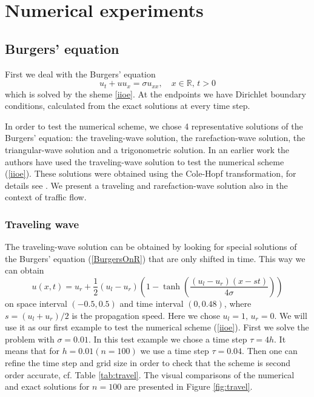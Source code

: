 \documentclass[a4paper,12pt,twoside]{report}%
\begin{document}

\chapter{Numerical experiments}
\section{Burgers' equation}
First we deal with the Burgers' equation
\begin{equation}
		u_t + uu_x =\sigma u_{xx},\quad x\in \mathbb{R},\, t > 0
		\label{BurgersOnR}
\end{equation}
which is solved by the sheme \eqref{iioe}. At the endpoints we have Dirichlet boundary conditions, calculated from the exact solutions at every time step.

In order to test the numerical scheme, we chose 4 representative solutions of the Burgers' equation:
the traveling-wave solution, the rarefaction-wave solution, the triangular-wave solution and a trigonometric solution. In an earlier work \cite{iioe0} the authors have used the traveling-wave solution to test the numerical scheme (\ref{iioe}). These solutions were obtained using the Cole-Hopf transformation, for details see \cite{olv}. We present a traveling and rarefaction-wave solution also in the context of traffic flow.
\subsection{Traveling wave}
The traveling-wave solution can be obtained by looking for special solutions of the Burgers' equation (\ref{BurgersOnR}) that are only shifted in time. This way we can obtain
\begin{equation}
	u(x,t) = u_r + \frac{1}{2}(u_l-u_r)\left(1-\tanh \left(\frac{(u_l-u_r)(x-st)}{4 \sigma}\right) \right)
	\label{travel}
\end{equation}
on space interval $ (-0.5, 0.5) $ and time interval $ (0, 0.48) $, where $ s = (u_l + u_r)/2 $ is the propagation speed. Here we chose $ u_l = 1,\,u_r = 0 $. We will use it as our first example to test the numerical scheme (\ref{iioe}).
First we solve the problem with $ \sigma = 0.01 $.
In this test example we chose a time step $ \tau = 4h $. It means that for $ h = 0.01 (n = 100) $ we use a time step $ \tau = 0.04 $. Then one can refine the time step and grid size in order to check that the scheme is second order accurate, cf. Table \ref{tab:travel}. The visual comparisons of the numerical and exact solutions for $ n = 100 $ are presented in Figure \ref{fig:travel}.
\end{document}
